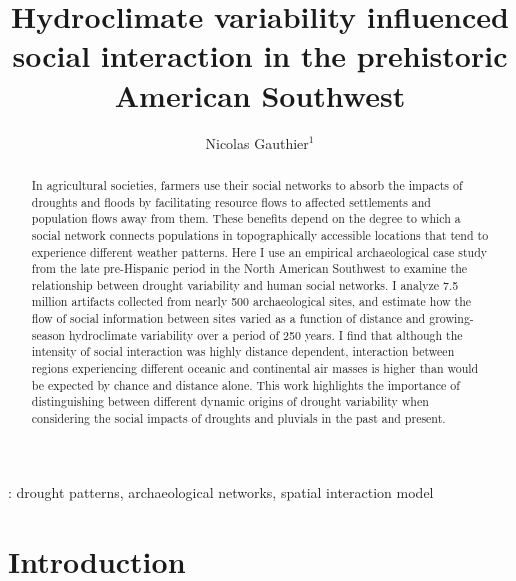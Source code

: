 \documentclass[11pt]{iopart}
\begin{document}
\title{Hydroclimate variability influenced social interaction in the prehistoric American Southwest}

\author{Nicolas Gauthier$^1$}

\address{$^1$ School of Human Evolution and Social Change, 900 S Cady Mall, Tempe, USA}


\begin{abstract}
  In agricultural societies, farmers use their social networks to absorb the impacts of droughts and floods by facilitating resource flows to affected settlements and population flows away from them. These benefits depend on the degree to which a social network connects populations in topographically accessible locations that tend to experience different weather patterns. Here I use an empirical archaeological case study from the late pre-Hispanic period in the North American Southwest to examine the relationship between drought variability and human social networks. I analyze 7.5 million artifacts collected from nearly 500 archaeological sites, and estimate how the flow of social information between sites varied as a function of distance and growing-season hydroclimate variability over a period of 250 years. I find that although the intensity of social interaction was highly distance dependent, interaction between regions experiencing different oceanic and continental air masses is higher than would be expected by chance and distance alone. This work highlights the importance of distinguishing between different dynamic origins of drought variability when considering the social impacts of droughts and pluvials in the past and present.
\end{abstract}

: drought patterns, archaeological networks, spatial interaction model 

\maketitle


\section*{Introduction}
\end{document}
